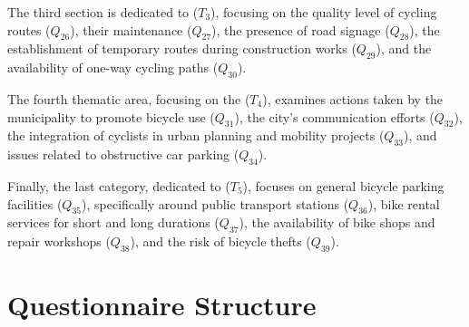 The third section is dedicated to  (\(T_{3}\)), focusing on the quality level of cycling routes (\(Q_{26}\)), their maintenance (\(Q_{27}\)), the presence of road signage (\(Q_{28}\)), the establishment of temporary routes during construction works (\(Q_{29}\)), and the availability of one-way cycling paths (\(Q_{30}\)).

The fourth thematic area, focusing on the  (\(T_{4}\)), examines actions taken by the municipality to promote bicycle use (\(Q_{31}\)), the city's communication efforts (\(Q_{32}\)), the integration of cyclists in urban planning and mobility projects (\(Q_{33}\)), and issues related to obstructive car parking (\(Q_{34}\)).

Finally, the last category, dedicated to  (\(T_{5}\)), focuses on general bicycle parking facilities (\(Q_{35}\)), specifically around public transport stations (\(Q_{36}\)), bike rental services for short and long durations (\(Q_{37}\)), the availability of bike shops and repair workshops (\(Q_{38}\)), and the risk of bicycle thefts (\(Q_{39}\)).%

    \newpage
\section{Questionnaire Structure}
    \label{annexes:structure-questionnaire-fub-tableau}

